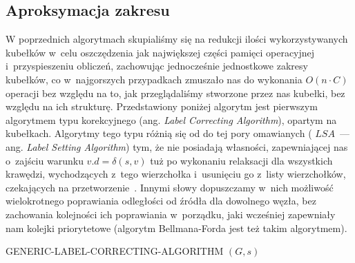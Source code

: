 \subsection{Aproksymacja zakresu}

W poprzednich algorytmach skupialiśmy się na redukcji ilości wykorzystywanych kubełków w~celu oszczędzenia jak największej części pamięci operacyjnej i~przyspieszeniu obliczeń, zachowując jednocześnie jednostkowe zakresy kubełków, co w~najgorszych przypadkach zmuszało nas do wykonania $O \left( n \cdot C \right)$ operacji bez względu na to, jak przeglądaliśmy stworzone przez nas kubełki, bez względu na ich strukturę. Przedstawiony poniżej algorytm jest pierwszym algorytmem typu korekcyjnego (ang. \textit{Label Correcting Algorithm}), opartym na kubełkach. Algorytmy tego typu różnią się od do tej pory omawianych ( $LSA$~--- ang. \textit{Label Setting Algorithm}) tym, że nie posiadają własności, zapewniającej nas o~zajściu warunku $v.d = \delta \left( s, v \right)$ tuż po wykonaniu relaksacji dla wszystkich krawędzi, wychodzących z~tego wierzchołka i~usunięciu go z~listy wierzchołków, czekających na przetworzenie~\cite[$17$]{OR}. Innymi słowy dopuszczamy w~nich możliwość wielokrotnego poprawiania odległości od źródła dla dowolnego węzła, bez zachowania kolejności ich poprawiania w~porządku, jaki wcześniej zapewniały nam kolejki priorytetowe (algorytm Bellmana-Forda jest też takim algorytmem). 

\begin{algorithm}[!htbp]
\DontPrintSemicolon
{}
\caption{ GENERIC-LABEL-CORRECTING-ALGORITHM $\left( G, s \right)$\label{alg:GenericLabelCorrectingAlgorithm}}
\end{algorithm}

